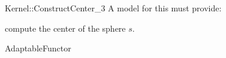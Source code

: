 \begin{ccRefFunctionObjectConcept}{Kernel::ConstructCenter_3}
A model for this must provide:


 {compute the center of the sphere $s$.}

\ccRefines
AdaptableFunctor

\ccSeeAlso
{}  \\

\end{ccRefFunctionObjectConcept}
